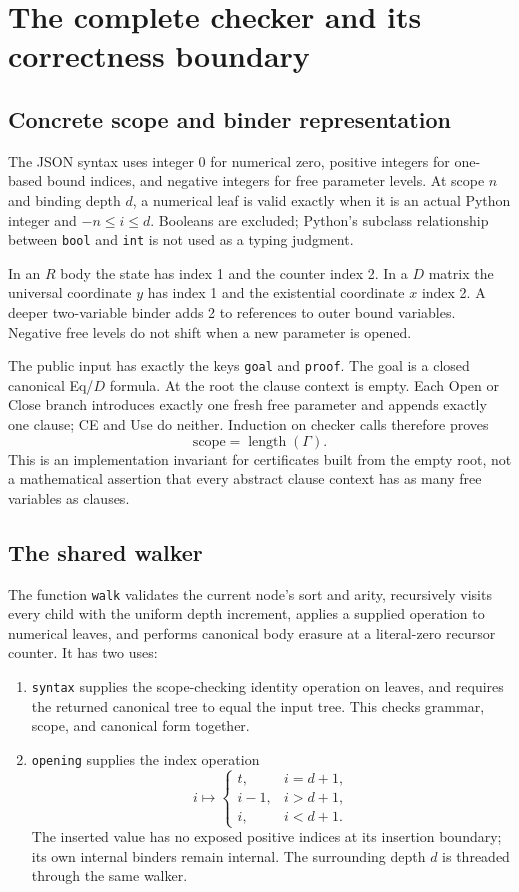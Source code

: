 \section{The complete checker and its correctness boundary}\label{sec:checker}

\subsection{Concrete scope and binder representation}

The JSON syntax uses integer $0$ for numerical zero, positive integers for
one-based bound indices, and negative integers for free parameter levels.
At scope $n$ and binding depth $d$, a numerical leaf is valid exactly when
it is an actual Python integer and $-n\le i\le d$. Booleans are excluded;
Python's subclass relationship between \texttt{bool} and \texttt{int} is
not used as a typing judgment.

In an $R$ body the state has index 1 and the counter index 2. In a $D$
matrix the universal coordinate $y$ has index 1 and the existential
coordinate $x$ index 2. A deeper two-variable binder adds 2 to references
to outer bound variables. Negative free levels do not shift when a new
parameter is opened.

The public input has exactly the keys \texttt{goal} and \texttt{proof}.
The goal is a closed canonical Eq/$D$ formula. At the root the clause
context is empty. Each Open or Close branch introduces exactly one
fresh free parameter and appends exactly one clause; CE and Use do neither.
Induction on checker calls therefore proves
\[
                  \text{scope}=\operatorname{length}(\Gamma).
\]
This is an implementation invariant for certificates built from the empty
root, not a mathematical assertion that every abstract clause context
has as many free variables as clauses.

\subsection{The shared walker}

The function \texttt{walk} validates the current node's sort and arity,
recursively visits every child with the uniform depth increment, applies
a supplied operation to numerical leaves, and performs canonical body
erasure at a literal-zero recursor counter. It has two uses:
\begin{enumerate}
\item \texttt{syntax} supplies the scope-checking identity operation on
leaves, and requires the returned canonical tree to equal the input tree.
This checks grammar, scope, and canonical form together.
\item \texttt{opening} supplies the index operation
\[
 i\longmapsto
 \begin{cases}
 t,&i=d+1,\\
 i-1,&i>d+1,\\
 i,&i<d+1.
 \end{cases}
\]
The inserted value has no exposed positive indices at its insertion
boundary; its own internal binders remain internal. The surrounding
depth $d$ is threaded through the same walker.
\end{enumerate}

